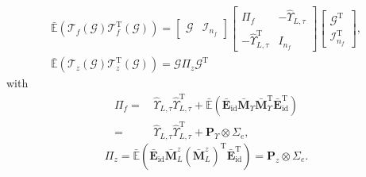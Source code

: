 \documentclass[twocolumn]{autart}
\begin{document}
\begin{gather}
\mathbb{\bar E} \left( {\mathcal{T}}_{f} \left( \mathcal{G} \right) {\mathcal{T}}_{f}^\mathrm{T} \left( \mathcal{G} \right) \right)
= \left[ \begin{array}{cc}
         \mathcal{G} & \mathcal{I}_{n_f}
       \end{array} \right]
\left[ \begin{array}{cc}
         \Pi_f & -\hat {\Upsilon}_{L,\tau} \\
         -\hat {\Upsilon}_{L,\tau}^\mathrm{T} & I_{n_f}
       \end{array}
 \right]
\left[ \begin{array}{c}
         \mathcal{G}^\mathrm{T} \\
         \mathcal{I}_{n_f}^\mathrm{T}
       \end{array}
 \right], \\
\mathbb{\bar E} \left( {\mathcal{T}}_{z} \left( \mathcal{G} \right) {\mathcal{T}}_{z}^\mathrm{T} \left( \mathcal{G} \right) \right)
= \mathcal{G} \Pi_z \mathcal{G}^\mathrm{T}
\end{gather}
with
\begin{equation}\label{eq:pif}
\begin{aligned}
\Pi_f =&\, \hat {\Upsilon}_{L,\tau} \hat {\Upsilon}_{L,\tau}^\mathrm{T} +
         \mathbb{\bar E}\left( \mathbf{\bar E}_{\mathrm{id}} \mathbf{\bar M}_{\Upsilon} \mathbf{\bar M}_{\Upsilon}^\mathrm{T} \mathbf{\bar E}_{\mathrm{id}}^\mathrm{T} \right) \\
      =&\, \hat {\Upsilon}_{L,\tau} \hat {\Upsilon}_{L,\tau}^\mathrm{T} + \mathbf{P}_{\Upsilon} \otimes \Sigma_e,
\end{aligned}
\end{equation}
\begin{equation}\label{eq:piz}
\Pi_z = \mathbb{\bar E}\left( \mathbf{\bar E}_{\mathrm{id}} \mathbf{\bar M}_{L}^z (\mathbf{\bar M}_{L}^z)^{\mathrm{T}} \mathbf{\bar E}_{\mathrm{id}}^\mathrm{T} \right) = \mathbf{P}_{z} \otimes \Sigma_e.
\end{equation}
\end{document}
